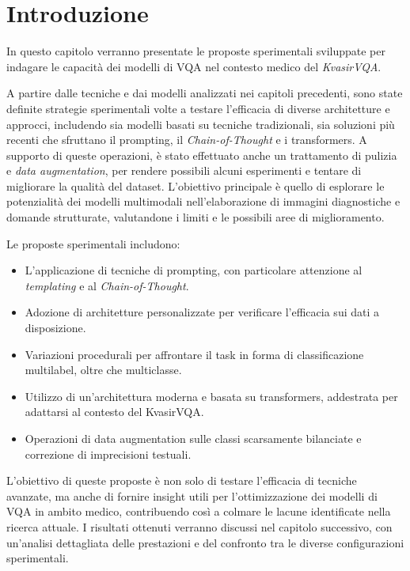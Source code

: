 \documentclass[../main.tex]{subfiles}
\begin{document}
\section{Introduzione}

In questo capitolo verranno presentate le proposte sperimentali sviluppate per indagare le capacità dei modelli di VQA nel contesto medico del \textit{KvasirVQA}. 

A partire dalle tecniche e dai modelli analizzati nei capitoli precedenti, sono state definite strategie sperimentali volte a testare l'efficacia di diverse architetture e approcci, includendo sia modelli basati su tecniche tradizionali, sia soluzioni più recenti che sfruttano il prompting, il \textit{Chain-of-Thought} e i transformers. 
A supporto di queste operazioni, è stato effettuato anche un trattamento di pulizia e \textit{data augmentation}, per rendere possibili alcuni esperimenti e tentare di migliorare la qualità del dataset.
L'obiettivo principale è quello di esplorare le potenzialità dei modelli multimodali nell'elaborazione di immagini diagnostiche e domande strutturate, valutandone i limiti e le possibili aree di miglioramento.

Le proposte sperimentali includono:
\begin{itemize}
    \item L'applicazione di tecniche di prompting, con particolare attenzione al \textit{templating} e al \textit{Chain-of-Thought}.
    \item Adozione di architetture personalizzate per verificare l'efficacia sui dati a disposizione.
    \item Variazioni procedurali per affrontare il task in forma di classificazione multilabel, oltre che multiclasse.
    \item Utilizzo di un'architettura moderna e basata su transformers, addestrata per adattarsi al contesto del KvasirVQA.
    \item Operazioni di data augmentation sulle classi scarsamente bilanciate e correzione di imprecisioni testuali.
\end{itemize}

L'obiettivo di queste proposte è non solo di testare l'efficacia di tecniche avanzate, ma anche di fornire insight utili per l'ottimizzazione dei modelli di VQA in ambito medico, contribuendo così a colmare le lacune identificate nella ricerca attuale.
I risultati ottenuti verranno discussi nel capitolo successivo, con un'analisi dettagliata delle prestazioni e del confronto tra le diverse configurazioni sperimentali.
\end{document}
